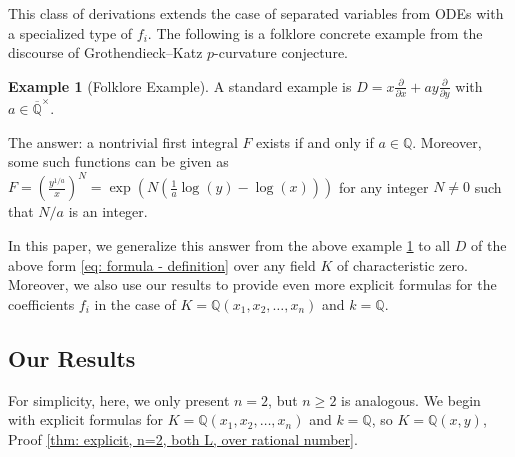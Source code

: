 \documentclass{amsart}
\newcommand{\op}{\operatorname}
\theoremstyle{definition}
\newtheorem{example}[thm]{Example}
\begin{document}
This class of derivations extends the case of separated variables from ODEs with a specialized type of $f_i$.
The following is a folklore concrete example from the discourse of Grothendieck--Katz $p$-curvature conjecture.

\begin{example}[Folklore Example]\label{ex: folclor example}
    A standard example is $D=x\frac{\partial}{\partial x}+ay\frac{\partial}{\partial y}$ with $a\in \overline{\mathbb{Q}}^{\times}$. 
    
    The answer: a nontrivial first integral $F$ exists if and only if $a\in \mathbb{Q}$. Moreover, some such functions can be given as $F=\left(\frac{y^{1/a}}{x}\right)^N=\op{exp}\left(N(\frac{1}{a}\op{log}(y)-\op{log}(x))\right)$ for any integer $N\ne 0$ such that $N/a$ is an integer.
\end{example}

In this paper, we generalize this answer from the above example \ref{ex: folclor example} to all $D$ of the above form \ref{eq: formula - definition} over any field $K$ of characteristic zero. Moreover, we also use our results to provide even more explicit formulas for the coefficients $f_i$ in the case of $K=\mathbb{Q}(x_1,x_2,\ldots,x_n)$ and $k=\mathbb{Q}$.


\subsection{Our Results}
For simplicity, here, we only present $n=2$, but $n\ge 2$ is analogous.
We begin with explicit formulas for $K=\mathbb{Q}(x_1,x_2,\ldots,x_n)$ and $k=\mathbb{Q}$, so $K=\mathbb{Q}(x,y)$, Proof \ref{thm: explicit, n=2, both L, over rational number}.
\end{document}
